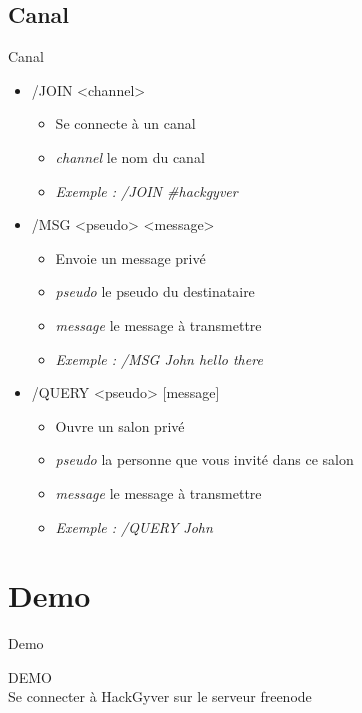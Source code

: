 \documentclass{beamer}
\begin{document}
	\subsection{Canal} %
\begin{frame}{Canal}
\begin{itemize}	
	\itemsep1.3em
		\item /JOIN <channel>
		\begin{itemize}
			\item Se connecte à un canal
			\item \textit{channel} le nom du canal
			\item \textit{Exemple : /JOIN \#hackgyver}
		\end{itemize}
		\item /MSG <pseudo> <message>
		\begin{itemize}
			\item Envoie un message privé
			\item \textit{pseudo} le pseudo du destinataire
			\item \textit{message} le message à transmettre
			\item \textit{Exemple : /MSG John hello there}
		\end{itemize}
		\item /QUERY <pseudo> [message]
		\begin{itemize}
			\item Ouvre un salon privé
			\item \textit{pseudo} la personne que vous invité dans ce salon
			\item \textit{message} le message à transmettre
			\item \textit{Exemple : /QUERY John}
		\end{itemize}
\end{itemize}
\end{frame}

\section{Demo}
\begin{frame}{Demo}
\begin{center}
	\Huge{DEMO} \\
	\Large{Se connecter à HackGyver sur le serveur freenode}
\end{center}
\end{frame}

\end{document}
